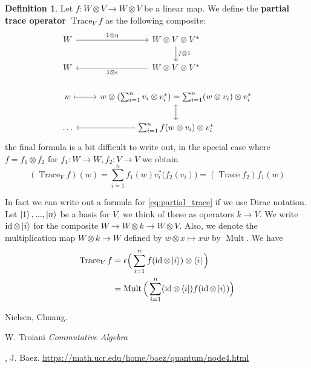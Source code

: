 \documentclass[12pt]{article}
\theoremstyle{plain}
\theoremstyle{definition}
\newtheorem{defn}[thm]{Definition} %
\newcommand{\lto}{\longrightarrow}
\begin{document}
\begin{defn}
	Let $f: W \otimes V \lto W \otimes V$ be a linear map. We define the \textbf{partial trace operator} $\operatorname{Trace}_Vf$ as the following composite:
	\begin{equation}\label{eq:partial_trace}
		\begin{tikzcd}
			W\arrow[r,"{1 \otimes \eta}"] & W \otimes V \otimes V^\ast\arrow[d,"{f \otimes 1}"]\\
			W & W \otimes V \otimes V^\ast\arrow[l,"{1 \otimes \epsilon}"]\\
			w\arrow[r,mapsto] & w \otimes (\sum_{i = 1}^n v_i \otimes v_i^\ast) = \sum_{i = 1}^n(w \otimes v_i) \otimes v_i^\ast\arrow[d,mapsto]\\
			 \hdots & \sum_{i = 1}^n f(w \otimes v_i) \otimes v_i^\ast\arrow[l,mapsto]
		\end{tikzcd}
	\end{equation}
	the final formula is a bit difficult to write out, in the special case where $f = f_1 \otimes f_2$ for $f_1: W \lto W, f_2: V \lto V$ we obtain
	\begin{equation}
		(\operatorname{Trace}_Vf)(w) = \sum_{i = 1}^n f_1(w)v_i^\ast\big(f_2(v_i)\big) = (\operatorname{Trace}f_2)f_1(w)
	\end{equation}
\end{defn}
In fact we can write out a formula for \eqref{eq:partial_trace} if we use Dirac notation. Let $\ket{1},...,\ket{n}$ be a basis for $V$, we think of these as operators $k \lto V$.  We write $\operatorname{id} \otimes \ket{i}$ for the composite $W \lto W \otimes k \lto W \otimes V$.  Also, we denote the multiplication map $W \otimes k \lto W$ defined by $w \otimes x \longmapsto xw$ by $\operatorname{Mult}$. We have
\begin{align*}
	\operatorname{Trace}_V f &= \epsilon\Big(\sum_{i = 1}^n f(\operatorname{id} \otimes \ket{i}) \otimes \bra{i}\Big)\\
	&= \operatorname{Mult}\Big(\sum_{i = 1}^n (\operatorname{id} \otimes \bra{i})f (\operatorname{id} \otimes \ket{i})\Big)
\end{align*}
	
	\begin{thebibliography}{9}
		 Nielsen, Chuang.
		
		 W. Troiani \emph{Commutative Algebra}
		
		, J. Baez. \url{https://math.ucr.edu/home/baez/quantum/node4.html}
	\end{thebibliography}
\end{document}
